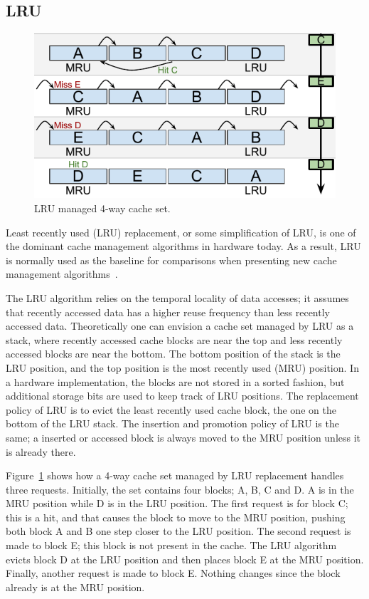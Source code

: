 
\subsection{LRU}
\label{sec:algorithms:lru}

\begin{figure}[ht]
    \centering
    \includegraphics[width=.65\textwidth]{figures/algorithms/LRU}
    \caption{LRU managed 4-way cache set.}
    \label{fig:algorithms:lru_example}
\end{figure}

\noindent
Least recently used (LRU) replacement, or some simplification of LRU, is one of the dominant cache management algorithms in hardware today. 
As a result, LRU is normally used as the baseline for comparisons when presenting new cache management algorithms~\cite{Jaleel2010,Qureshi2006,Qureshi2007}.

The LRU algorithm relies on the temporal locality of data accesses; it assumes that recently accessed data has a higher reuse frequency than less recently accessed data.
Theoretically one can envision a cache set managed by LRU as a stack, where recently accessed cache blocks are near the top and less recently accessed blocks are near the bottom.
The bottom position of the stack is the LRU position, and the top position is the most recently used (MRU) position.
In a hardware implementation, the blocks are not stored in a sorted fashion, but additional storage bits are used to keep track of LRU positions.
The replacement policy of LRU is to evict the least recently used cache block, the one on the bottom of the LRU stack.
The insertion and promotion policy of LRU is the same; a inserted or accessed block is always moved to the MRU position unless it is already there.

Figure~\ref{fig:algorithms:lru_example} shows how a 4-way cache set managed by LRU replacement handles three requests. 
Initially, the set contains four blocks; A, B, C and D. 
A is in the MRU position while D is in the LRU position.
The first request is for block C; this is a hit, and that causes the block to move to the MRU position, pushing both block A and B one step closer to the LRU position.
The second request is made to block E; this block is not present in the cache.
The LRU algorithm evicts block D at the LRU position and then places block E at the MRU position.
Finally, another request is made to block E. Nothing changes since the block already is at the MRU position.

